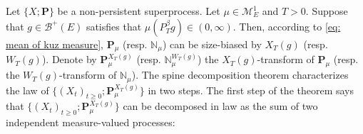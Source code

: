 \documentclass[12pt, a4paper]{amsart}
\theoremstyle{definition}
\numberwithin{equation}{section}
\begin{document}
	Let $\{X;\mathbf P\}$ be a non-persistent superprocess.
	Let $\mu \in \mathcal M^1_E$ and $T>0$.
	Suppose that $g\in \mathscr B^+(E)$ satisfies that $\mu(P^\beta_Tg) \in (0,\infty)$.
	Then, according to \eqref{eq: mean of kuz measure}, $\mathbf P_\mu$ (resp. $\mathbb N_\mu$) can be size-biased by $X_T(g)$ (resp. $W_T(g)$).
	Denote by $\mathbf P_\mu^{X_T(g)}$ (resp. $\mathbb N^{W_T(g)}_\mu$) the $X_T(g)$-transform of $\mathbf P_\mu$ (resp. the $W_T(g)$-transform of $\mathbb N_\mu$).
	The spine decomposition theorem characterizes the law of $\{(X_t)_{t\geq 0}; \mathbf P_\mu^{X_T(g)}\}$ in two steps.
	The first step of the theorem says that $\{(X_t)_{t\geq 0}; \mathbf P_\mu^{X_T(g)}\}$ can be decomposed in law as the sum of two independent measure-valued processes:
	
\end{document}
